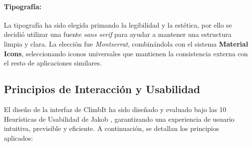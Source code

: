 \paragraph{Tipografía:} La tipografía ha sido elegida primando la legibilidad y la estética, por ello se decidió utilizar una fuente \textit{sans serif} para ayudar a mantener una estructura limpia y clara. La elección fue \textit{Montserrat}, combinándola con el sistema \textbf{Material Icons}, seleccionando iconos universales que mantienen la consistencia externa con el resto de aplicaciones similares.

\subsection{Principios de Interacción y Usabilidad}

El diseño de la interfaz de ClimbIt ha sido diseñado y evaluado bajo las 10 Heurísticas de Usabilidad de Jakob \cite{nielsen1994heuristics}, garantizando una experiencia de usuario intuitiva, previsible y eficiente. A continuación, se detallan los principios aplicados:

